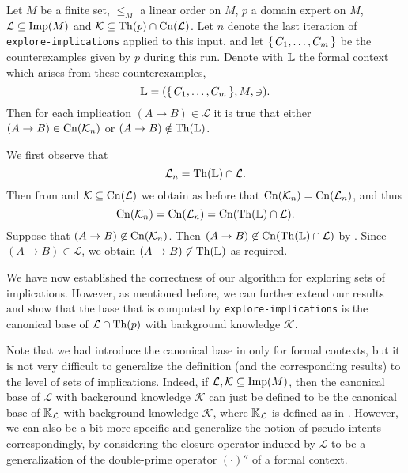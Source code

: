 \begin{Theorem}
  \label{thm:explore-implications-counterexamples-context}
  Let $M$ be a finite set, $\leq_{M}$ a linear order on $M$, $p$ a domain expert on $M$,
  $\mathcal{L} \subseteq \operatorname{Imp}(M)$ and $\mathcal{K} \subseteq \operatorname{Th}(p) \cap
  \operatorname{Cn}(\mathcal{L})$.  Let $n$ denote the last iteration of
  \lstinline{explore-implications} applied to this input, and let ${\{\, C_{1}, \dots,
    C_{m} \,\}}$ be the counterexamples given by $p$ during this run.  Denote with ${\mathbb{L}}$
  the formal context which arises from these counterexamples, \ie
  \begin{equation*}
    {\ensuremath{\mathbb{L}}} = ({\{\, C_{1}, \dots, C_{m} \,\}}, M, \ni).
  \end{equation*}
  Then for each implication $(A \to B) \in \mathcal{L}$ it is true that either $(A \to B)
  \in \operatorname{Cn}(\mathcal{K}_{n})$ or $(A \to B) \notin \operatorname{Th}({\mathbb{L}})$.
\end{Theorem}
\begin{Proof}
  We first observe that
  \begin{equation*}
    \mathcal{L}_{n} = \operatorname{Th}({\mathbb{L}}) \cap \mathcal{L}.
  \end{equation*}
  Then from  and $\mathcal{K} \subseteq
  \operatorname{Cn}(\mathcal{L})$ we obtain as before that $\operatorname{Cn}(\mathcal{K}_{n}) =
  \operatorname{Cn}(\mathcal{L}_{n})$, and thus
  \begin{equation}
    \label{eq:37}
    \operatorname{Cn}(\mathcal{K}_{n}) = \operatorname{Cn}(\mathcal{L}_{n}) = \operatorname{Cn}(\operatorname{Th}({\mathbb{L}}) \cap \mathcal{L}).
  \end{equation}
  Suppose that $(A \to B) \not\in \operatorname{Cn}(\mathcal{K}_{n})$.  Then $(A \to B) \not\in
  \operatorname{Cn}(\operatorname{Th}({\mathbb{L}}) \cap \mathcal{L})$ by .  Since $(A \to B) \in \mathcal{L}$,
  we obtain $(A \to B) \not\in \operatorname{Th}({\mathbb{L}})$ as required.
\end{Proof}

We have now established the correctness of our algorithm for exploring sets of
implications.  However, as mentioned before, we can further extend our results and show
that the base that is computed by \lstinline{explore-implications} is the canonical base
of $\mathcal{L} \cap \operatorname{Th}(p)$ with background knowledge $\mathcal{K}$.

Note that we had introduce the canonical base in  only for
formal contexts, but it is not very difficult to generalize the definition (and the
corresponding results) to the level of sets of implications.  Indeed, if $\mathcal{L},
\mathcal{K} \subseteq \operatorname{Imp}(M)$, then the canonical base of $\mathcal{L}$ with background
knowledge $\mathcal{K}$ can just be defined to be the canonical base of ${\mathbb{K}}_{\mathcal{L}}$ with background knowledge $\mathcal{K}$, where ${\mathbb{K}}_{\mathcal{L}}$ is
defined as in .  However, we can also be a bit
more specific and generalize the notion of pseudo-intents correspondingly, by considering
the closure operator induced by $\mathcal{L}$ to be a generalization of the double-prime
operator $(\cdot)''$ of a formal context.

